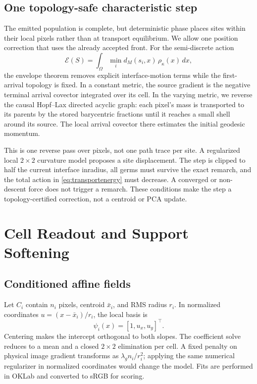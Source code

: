 \documentclass[11pt,letterpaper]{article}
\begin{document}
\subsection{One topology-safe characteristic step}

The emitted population is complete, but deterministic phase places sites within their
local pixels rather than at transport equilibrium. We allow one position correction
that uses the already accepted front. For the semi-discrete action
\begin{equation}
\mathcal E(S)=\int_{\Omega} \min_i d_M(s_i,x)\,\rho_\kappa(x)\,dx,
\label{eq:transportenergy}
\end{equation}
the envelope theorem removes explicit interface-motion terms while the first-arrival
topology is fixed. In a constant metric, the source gradient is the negative terminal
arrival covector integrated over its cell. In the varying metric, we reverse the causal
Hopf--Lax directed acyclic graph: each pixel's mass is transported to its parents by the
stored barycentric fractions until it reaches a small shell around its source. The local
arrival covector there estimates the initial geodesic momentum.

This is one reverse pass over pixels, not one path trace per site. A regularized local
\(2\times2\) curvature model proposes a site displacement. The step is clipped to half
the current interface inradius, all germs must survive the exact remarch, and the total
action in \cref{eq:transportenergy} must decrease. A converged or non-descent force does
not trigger a remarch. These conditions make the step a topology-certified correction,
not a centroid or PCA update.

\section{Cell Readout and Support Softening}
\label{sec:readout}

\subsection{Conditioned affine fields}

Let \(C_i\) contain \(n_i\) pixels, centroid \(\bar x_i\), and RMS radius \(r_i\).
In normalized coordinates \(u=(x-\bar x_i)/r_i\), the local basis is
\begin{equation}
\psi_i(x)=[1,u_x,u_y]^\top.
\end{equation}
Centering makes the intercept orthogonal to both slopes. The coefficient solve reduces
to a mean and a closed \(2\times2\) elimination per cell. A fixed penalty on physical
image gradient transforms as \(\lambda_gn_i/r_i^2\); applying the same numerical
regularizer in normalized coordinates would change the model. Fits are performed in
OKLab and converted to sRGB for scoring.
\end{document}
